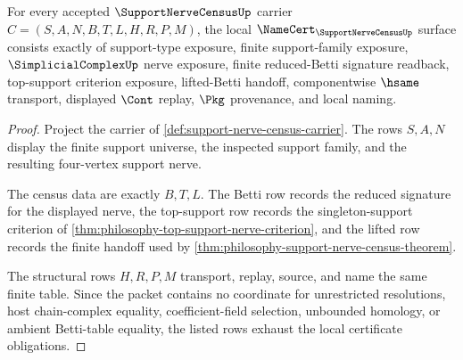 \begin{theorem}
\label{thm:support-nerve-census-namecert-obligations}
For every accepted $\SupportNerveCensusUp$ carrier $C=(S,A,N,B,T,L,H,R,P,M)$, the local $\NameCert_{\SupportNerveCensusUp}$ surface consists exactly of support-type exposure, finite support-family exposure, $\SimplicialComplexUp$ nerve exposure, finite reduced-Betti signature readback, top-support criterion exposure, lifted-Betti handoff, componentwise $\hsame$ transport, displayed $\Cont$ replay, $\Pkg$ provenance, and local naming.
\end{theorem}
\begin{proof}
Project the carrier of \autoref{def:support-nerve-census-carrier}. The rows $S,A,N$ display the finite support universe, the inspected support family, and the resulting four-vertex support nerve.

The census data are exactly $B,T,L$. The Betti row records the reduced signature for the displayed nerve, the top-support row records the singleton-support criterion of \autoref{thm:philosophy-top-support-nerve-criterion}, and the lifted row records the finite handoff used by \autoref{thm:philosophy-support-nerve-census-theorem}.

The structural rows $H,R,P,M$ transport, replay, source, and name the same finite table. Since the packet contains no coordinate for unrestricted resolutions, host chain-complex equality, coefficient-field selection, unbounded homology, or ambient Betti-table equality, the listed rows exhaust the local certificate obligations.
\end{proof}

